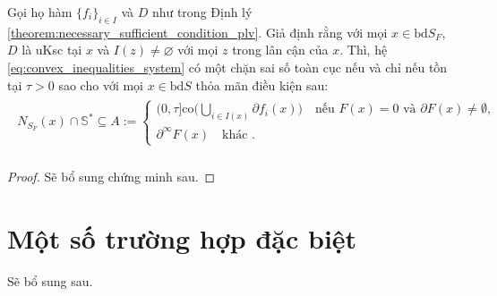 \begin{prop}
    Gọi họ hàm $\{f_i\}_{i \in I}$ và $D$ như trong Định lý \ref{theorem:necessary_sufficient_condition_plv}. Giả định rằng với mọi $x \in \text{bd}S_F$, $D$ là uKsc tại $x$ và $I(z) \ne \varnothing$ với mọi $z$ trong lân cận của $x$. Thì, hệ \eqref{eq:convex_inequalities_system} có một chặn sai số toàn cục nếu và chỉ nếu tồn tại $\tau > 0$ sao cho với mọi $x \in \text{bd}S$ thỏa mãn điều kiện sau:
    \begin{align}
        \begin{aligned} N_{S_F}(x)\cap \mathbb{S^*}\subseteq A:=\left\{ \begin{array}{ll} (0,\tau ]\textrm{co}\Big (\bigcup _{i\in I(x)}\partial f_i(x)\Big )\quad \textrm{nếu } F(x)=0 \text { và } \partial F(x)\ne \emptyset ,\\ \partial ^\infty F(x)\quad \textrm{khác }. \end{array}\right. \\ \end{aligned}
    \end{align}
\end{prop}
\begin{proof}
    Sẽ bổ sung chứng minh sau.
\end{proof}

\section{Một số trường hợp đặc biệt}

Sẽ bổ sung sau.